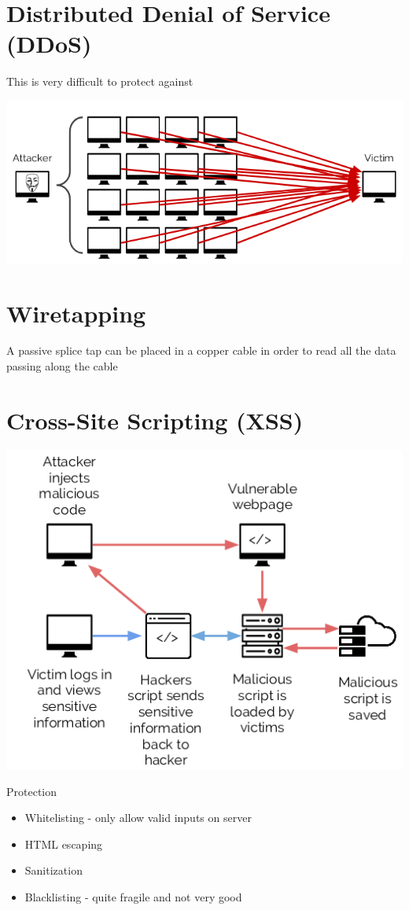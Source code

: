 \documentclass{article}[18pt]
\begin{document}
\section{Distributed Denial of Service (DDoS)}
This is very difficult to protect against
\begin{center}
	\includegraphics[scale=0.7]{DDoS}
\end{center}
\section{Wiretapping}
A passive splice tap can be placed in a copper cable in order to read all the data passing along the cable
\section{Cross-Site Scripting (XSS)}
\begin{center}
	\includegraphics[scale=0.7]{XSS}
\end{center}
Protection
\begin{itemize}
	\item Whitelisting - only allow valid inputs on server
	\item HTML escaping
	\item Sanitization
	\item Blacklisting - quite fragile and not very good
\end{itemize}
\end{document}
